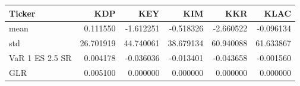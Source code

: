 \begin{tabular}{lrrrrr}
\toprule
Ticker & KDP & KEY & KIM & KKR & KLAC \\
\midrule
mean & 0.111550 & -1.612251 & -0.518326 & -2.660522 & -0.096134 \\
std & 26.701919 & 44.740061 & 38.679134 & 60.940088 & 61.633867 \\
VaR 1%
ES 2.5%
SR & 0.004178 & -0.036036 & -0.013401 & -0.043658 & -0.001560 \\
GLR & 0.005100 & 0.000000 & 0.000000 & 0.000000 & 0.000000 \\
\bottomrule
\end{tabular}
